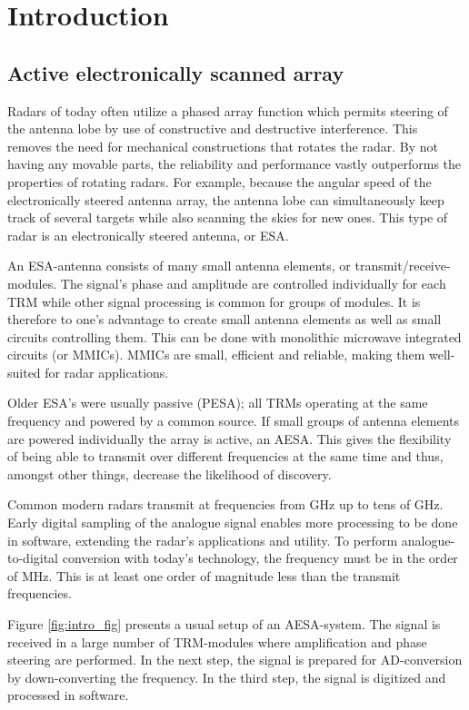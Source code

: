 \chapter{Introduction}
	\section{Active electronically scanned array}
		Radars of today often utilize a phased array function which permits steering of the antenna lobe by use of constructive and destructive interference. This removes the need for mechanical constructions that rotates the radar. By not having any movable parts, the reliability and performance vastly outperforms the properties of rotating radars. For example, because the angular speed of the electronically steered antenna array, the antenna lobe can simultaneously keep track of several targets while also scanning the skies for new ones. This type of radar is an electronically steered antenna, or ESA.\autocite{web:navair02}

		An ESA-antenna consists of many small antenna elements, or transmit/receive-modules. The signal's phase and amplitude are controlled individually for each TRM while other signal processing is common for groups of modules. It is therefore to one's advantage to create small antenna elements as well as small circuits controlling them. This can be done with monolithic microwave integrated circuits (or MMICs). MMICs are small, efficient and reliable, making them well-suited for radar applications.\autocite{stimson98}

		Older ESA's were usually passive (PESA); all TRMs operating at the same frequency and powered by a common source. If small groups of antenna elements are powered individually the array is active, an AESA. This gives the flexibility of being able to transmit over different frequencies at the same time and thus, amongst other things, decrease the likelihood of discovery.\autocites{oliner72}

		Common modern radars transmit at frequencies from \unit[1]{GHz} up to tens of GHz. Early digital sampling of the analogue signal enables more processing to be done in software, extending the radar's applications and utility. To perform analogue-to-digital conversion with today's technology, the frequency must be in the order of \unit[100]{MHz}. This is at least one order of magnitude less than the transmit frequencies.

		Figure \ref{fig:intro_fig} presents a usual setup of an AESA-system. The signal is received in a large number of TRM-modules where amplification and phase steering are performed. In the next step, the signal is prepared for AD-conversion by down-converting the frequency. In the third step, the signal is digitized and processed in software.

